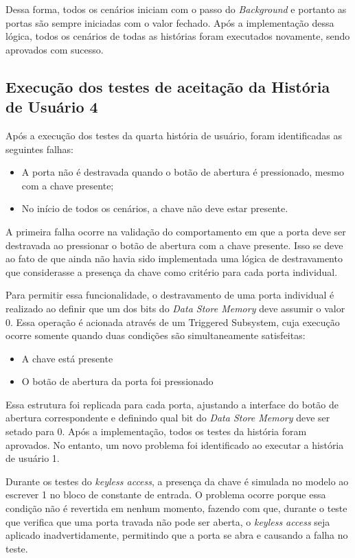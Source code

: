 Dessa forma, todos os cenários iniciam com o passo do \textit{Background} e portanto as portas são sempre iniciadas com o valor fechado. Após a implementação dessa 
lógica, todos os cenários de todas as histórias foram executados novamente, sendo aprovados com sucesso.


\subsection{Execução dos testes de aceitação da História de Usuário 4}

Após a execução dos testes da quarta história de usuário, foram identificadas as seguintes falhas:

\begin{itemize}
	\item A porta não é destravada quando o botão de abertura é pressionado, mesmo com a chave presente;
	\item No início de todos os cenários, a chave não deve estar presente.
\end{itemize}

A primeira falha ocorre na validação do comportamento em que a porta deve ser destravada ao pressionar o botão de abertura com a chave presente. Isso se deve ao fato 
de que ainda não havia sido implementada uma lógica de destravamento que considerasse a presença da chave como critério para cada porta individual.

Para permitir essa funcionalidade, o destravamento de uma porta individual é realizado ao definir que um dos bits do \textit{Data Store Memory} deve assumir o valor 0. 
Essa operação é acionada através de um Triggered Subsystem, cuja execução ocorre somente quando duas condições são simultaneamente satisfeitas:

\begin{itemize}
	\item A chave está presente
	\item O botão de abertura da porta foi pressionado
\end{itemize}

Essa estrutura foi replicada para cada porta, ajustando a interface do botão de abertura correspondente e definindo qual bit do \textit{Data Store Memory} deve ser setado 
para 0. Após a implementação, todos os testes da história foram aprovados. No entanto, um novo problema foi identificado ao executar a história de usuário 1.

Durante os testes do \textit{keyless access}, a presença da chave é simulada no modelo ao escrever 1 no bloco de constante de entrada. O problema ocorre porque essa 
condição não é revertida em nenhum momento, fazendo com que, durante o teste que verifica que uma porta travada não pode ser aberta, o \textit{keyless access} seja 
aplicado inadvertidamente, permitindo que a porta se abra e causando a falha no teste.

